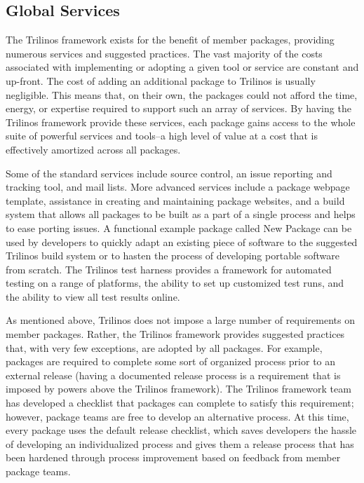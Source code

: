 \documentclass[times,10pt,twocolumn]{article}
\begin{document}
\subsection{Global Services}
\label{subsect:GlobalServices}

The Trilinos framework exists for the benefit of member packages,
providing numerous services and suggested practices.  The vast
majority of the costs associated with implementing or adopting a
given tool or service are constant and up-front.  The cost of adding
an additional package to Trilinos is usually negligible.  This means
that, on their own, the packages could not afford the time, energy,
or expertise required to support such an array of services.  By
having the Trilinos framework provide these services, each package
gains access to the whole suite of powerful services and tools--a
high level of value at a cost that is effectively amortized across
all packages.

Some of the standard services include source control, an issue
reporting and tracking tool, and mail lists.  More advanced services
include a package webpage template, assistance in creating and
maintaining package websites, and a build system that allows all
packages to be built as a part of a single process and helps to ease
porting issues.  A functional example package called New Package can
be used by developers to quickly adapt an existing piece of software
to the suggested Trilinos build system or to hasten the process of
developing portable software from scratch.  The Trilinos test
harness provides a framework for automated testing on a range of
platforms, the ability to set up customized test runs, and the
ability to view all test results online.

As mentioned above, Trilinos does not impose a large number of
requirements on member packages.  Rather, the Trilinos framework
provides suggested practices that, with very few exceptions, are
adopted by all packages. For example, packages are required to
complete some sort of organized process prior to an external release
(having a documented release process is a requirement that is
imposed by powers above the Trilinos framework).  The Trilinos
framework team has developed a checklist that packages can complete
to satisfy this requirement; however, package teams are free to
develop an alternative process.  At this time, every package uses
the default release checklist, which saves developers the hassle of
developing an individualized process and gives them a release
process that has been hardened through process improvement based on
feedback from member package teams.
\end{document}
